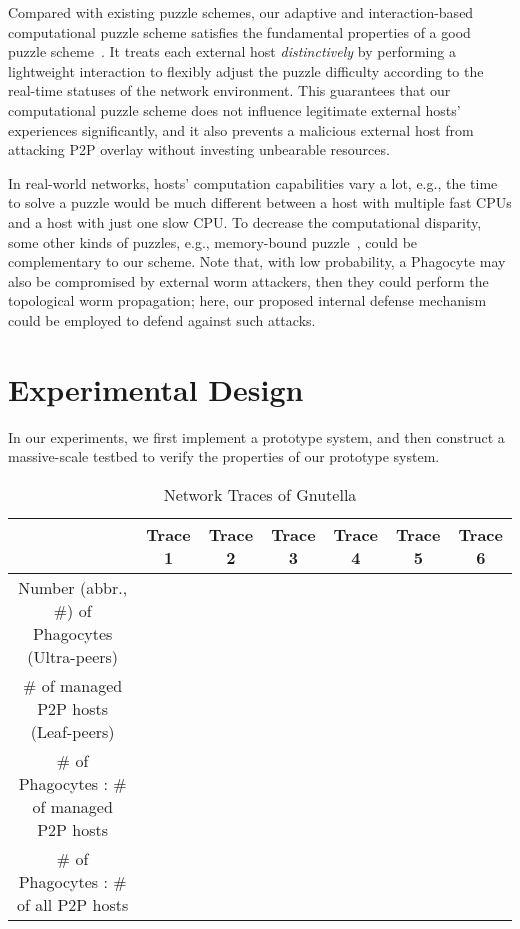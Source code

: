 \documentclass[times,10pt,twocolumn]{article}
\begin{document}
Compared with existing puzzle schemes, our adaptive and
interaction-based computational puzzle scheme satisfies the
fundamental properties of a good puzzle scheme~\cite{JuelsB99}. It
treats each external host \emph{distinctively} by performing a
lightweight interaction to flexibly adjust the puzzle difficulty
according to the real-time statuses of the network environment. This
guarantees that our computational puzzle scheme does not influence
legitimate external hosts' experiences significantly, and it also
prevents a malicious external host from attacking P2P overlay
without investing unbearable resources.


In real-world networks, hosts' computation capabilities vary a lot,
e.g., the time to solve a puzzle would be much different between a
host with multiple fast CPUs and a host with just one slow CPU. To
decrease the computational disparity, some other kinds of puzzles,
e.g., memory-bound puzzle~\cite{AbadiBMW05}, could be complementary
to our scheme. Note that, with low probability, a Phagocyte may also
be compromised by external worm attackers, then they could perform
the topological worm propagation; here, our proposed internal
defense mechanism could be employed to defend against such attacks.












\section{Experimental Design}
\label{sec:ExDesign}

In our experiments, we first implement a prototype system, and then
construct a massive-scale testbed to verify the properties of our
prototype system.

\begin{table*}[tbp]
    \centering
    \caption{Network Traces of Gnutella}
    \label{tab:trace}
    \footnotesize{
    \begin{tabular}{|c|c|c|c|c|c|c|}
        \hline
                                                       & Trace 1    & Trace 2     & Trace 3    & Trace 4    & Trace 5    & Trace 6   \\
        \hline
        Number (abbr., \#) of Phagocytes (Ultra-peers) &   &    &    &    &    &   \\
        \hline
        \# of managed P2P hosts (Leaf-peers)           &   &  &   &   &   &   \\
        \hline
        \# of Phagocytes : \# of managed P2P hosts     &   &    &   &   &   &  \\
        \hline
        \# of Phagocytes : \# of all P2P hosts         &   &    &    &   &   &  \\
        \hline
    \end{tabular}}
\end{table*}
\end{document}
